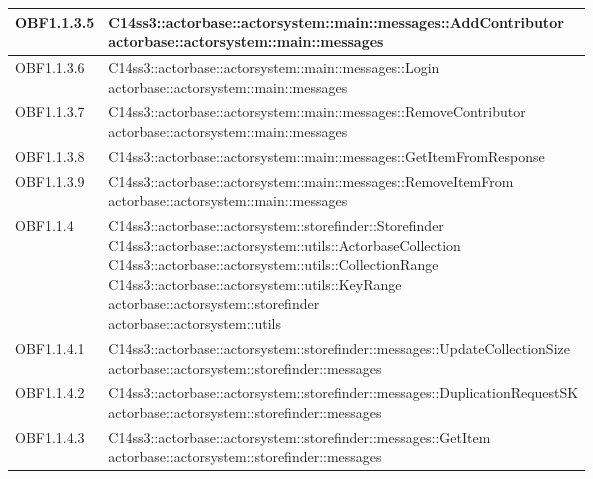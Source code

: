 \documentclass{scalatekids-article}
\begin{document}
\begin{longtable}[H]{|p{4.5cm}|p{13cm}|}
\hline
OBF1.1.3.5 & \multiLineCell[t]{C14ss3::actorbase::actorsystem::main::messages::AddContributor\\actorbase::actorsystem::main::messages\\}\\
\hline
OBF1.1.3.6 & \multiLineCell[t]{C14ss3::actorbase::actorsystem::main::messages::Login\\actorbase::actorsystem::main::messages\\}\\
\hline
OBF1.1.3.7 & \multiLineCell[t]{C14ss3::actorbase::actorsystem::main::messages::RemoveContributor\\actorbase::actorsystem::main::messages\\}\\
\hline
OBF1.1.3.8 & \multiLineCell[t]{C14ss3::actorbase::actorsystem::main::messages::GetItemFromResponse\\}\\
\hline
OBF1.1.3.9 & \multiLineCell[t]{C14ss3::actorbase::actorsystem::main::messages::RemoveItemFrom\\actorbase::actorsystem::main::messages\\}\\
\hline
OBF1.1.4 & \multiLineCell[t]{C14ss3::actorbase::actorsystem::storefinder::Storefinder\\C14ss3::actorbase::actorsystem::utils::ActorbaseCollection\\C14ss3::actorbase::actorsystem::utils::CollectionRange\\C14ss3::actorbase::actorsystem::utils::KeyRange\\actorbase::actorsystem::storefinder\\actorbase::actorsystem::utils\\}\\
\hline
OBF1.1.4.1 & \multiLineCell[t]{C14ss3::actorbase::actorsystem::storefinder::messages::UpdateCollectionSize\\actorbase::actorsystem::storefinder::messages\\}\\
\hline
OBF1.1.4.2 & \multiLineCell[t]{C14ss3::actorbase::actorsystem::storefinder::messages::DuplicationRequestSK\\actorbase::actorsystem::storefinder::messages\\}\\
\hline
OBF1.1.4.3 & \multiLineCell[t]{C14ss3::actorbase::actorsystem::storefinder::messages::GetItem\\actorbase::actorsystem::storefinder::messages\\}\\

\end{longtable}
\end{document}
